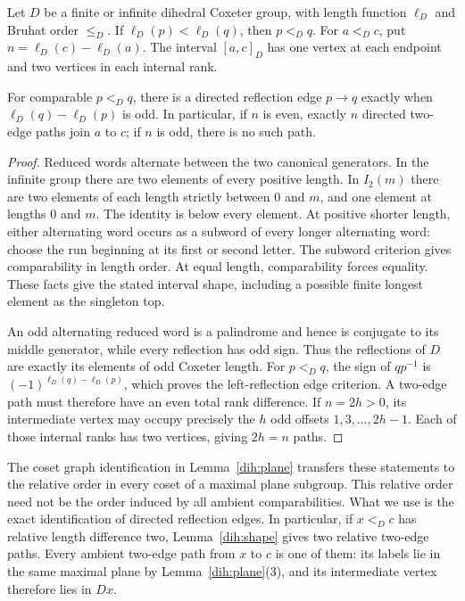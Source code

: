 \begin{lemma}\label{dih:shape}
Let $D$ be a finite or infinite dihedral Coxeter group, with length
function $\ell_D$ and Bruhat order $\le_D$.  If
$\ell_D(p)<\ell_D(q)$, then $p<_D q$.  For $a<_D c$, put
$n=\ell_D(c)-\ell_D(a)$.  The interval $[a,c]_D$ has one vertex at
each endpoint and two vertices in each internal rank.

For comparable $p<_D q$, there is a directed reflection edge $p\to q$
exactly when $\ell_D(q)-\ell_D(p)$ is odd.  In particular, if $n$ is
even, exactly $n$ directed two-edge paths join $a$ to $c$; if $n$ is
odd, there is no such path.
\end{lemma}

\begin{proof}
Reduced words alternate between the two canonical generators.  In the
infinite group there are two elements of every positive length.  In
$I_2(m)$ there are two elements of each length strictly between $0$ and
$m$, and one element at lengths $0$ and $m$.
The identity is below every element.  At positive shorter length, either
alternating word occurs as a subword of every longer alternating word:
choose the run beginning at its first or second letter.  The subword
criterion \cite[Theorem~2.2.2]{BB05} gives comparability in length order.
At equal length, comparability forces equality.  These facts give the
stated interval shape, including a possible finite longest element as the
singleton top.

An odd alternating reduced word is a palindrome and hence is conjugate
to its middle generator, while every reflection has odd sign.  Thus the
reflections of $D$ are exactly its elements of odd Coxeter length.  For $p<_D q$,
the sign of $qp^{-1}$ is $(-1)^{\ell_D(q)-\ell_D(p)}$, which proves the
left-reflection edge criterion.  A two-edge path must therefore have an
even total rank difference.  If $n=2h>0$, its intermediate vertex may
occupy precisely the $h$ odd offsets $1,3,\ldots,2h-1$.  Each of those
internal ranks has two vertices, giving $2h=n$ paths.
\end{proof}

\begin{remark}\label{dih:relative-paths}
The coset graph identification in Lemma~\ref{dih:plane} transfers these
statements to the relative order in every coset of a maximal plane
subgroup.  This relative order need not be the order induced by all
ambient comparabilities.  What we use is the exact identification of
directed reflection edges.
In particular, if $x<_D c$ has relative length difference two,
Lemma~\ref{dih:shape} gives two relative two-edge paths.  Every ambient
two-edge path from $x$ to $c$ is one of them: its labels lie in the same
maximal plane by Lemma~\ref{dih:plane}(3), and its intermediate vertex
therefore lies in $D x$.
\end{remark}

